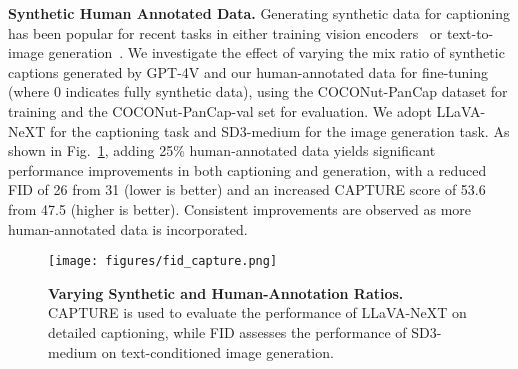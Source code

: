 \noindent\textbf{Synthetic \vs Human Annotated Data.} Generating synthetic data for captioning has been popular for recent tasks in either training vision encoders~\cite{radford2021clip} or text-to-image generation~\cite{li2024recaption}. We investigate the effect of varying the mix ratio of synthetic captions generated by GPT-4V and our human-annotated data for fine-tuning (where 0 indicates fully synthetic data), using the COCONut-PanCap dataset for training and the COCONut-PanCap-val set for evaluation. We adopt LLaVA-NeXT for the captioning task and SD3-medium for the image generation task. As shown in Fig.~\ref{fig:fid_capture}, adding 25\% human-annotated data yields significant performance improvements in both captioning and generation, with a reduced FID of 26 from 31 (lower is better) and an increased CAPTURE score of 53.6 from 47.5 (higher is better). Consistent improvements are observed as more human-annotated data is incorporated.



\begin{figure}[htbp]
    \centering
    \texttt{[image: figures/fid\_capture.png]}
    \vspace{-5pt}
    \caption{
    \textbf{Varying Synthetic and Human-Annotation Ratios.}
    CAPTURE is used to evaluate the performance of LLaVA-NeXT on detailed captioning, while FID assesses the performance of SD3-medium on text-conditioned image generation.
    }
        \vspace{-10pt}
    \label{fig:fid_capture}
\end{figure}


